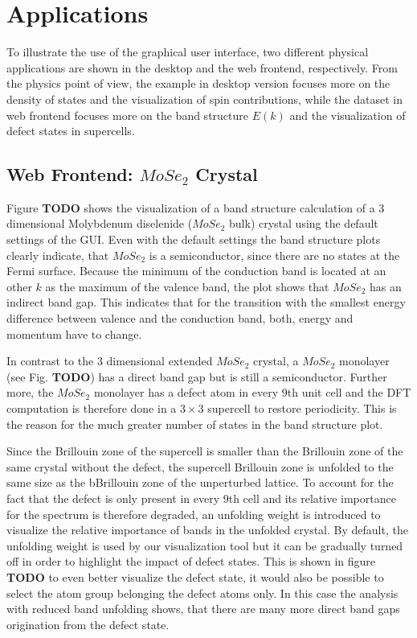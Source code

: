 \chapter{Applications}
\label{chap:applications}


To illustrate the use of the graphical user interface, two different physical
applications are shown in the desktop and the web frontend, respectively. From
the physics point of view, the example in desktop version focuses more on the
density of states and the visualization of spin contributions, while the dataset
in web frontend focuses more on the band structure $E(k)$ and the visualization
of defect states in supercells.

\section{Web Frontend: $MoSe_2$ Crystal}

Figure \textbf{TODO} shows the visualization of a band structure calculation of
a 3 dimensional Molybdenum diselenide ($MoSe_2$ bulk) crystal using the default
settings of the GUI. Even with the default settings the band structure plots
clearly indicate, that $MoSe_2$ is a semiconductor, since there are no states at
the Fermi surface. Because the minimum of the conduction band is located at an
other $k$ as the maximum of the valence band, the plot shows that $MoSe_2$ has
an indirect band gap. This indicates that for the transition with the smallest energy difference between valence and the conduction band, both, energy and momentum have to change.

In contrast to the 3 dimensional extended $MoSe_2$ crystal, a $MoSe_2$ monolayer
(see Fig. \textbf{TODO}) has a direct band gap but is still a semiconductor.
Further more, the $MoSe_2$ monolayer has a defect atom in every 9th unit cell
and the DFT computation is therefore done in a $3 \times 3$ supercell to restore
periodicity. This is the reason for the much greater number of states in the
band structure plot. 

Since the Brillouin zone of the supercell is smaller than the Brillouin zone of
the same crystal without the defect, the supercell Brillouin zone is unfolded
to the same size as the bBrillouin zone of the unperturbed lattice. To account
for the fact that the defect is only present in every 9th cell and its relative importance for the spectrum is therefore degraded, an unfolding weight is introduced to visualize the relative importance of bands in the unfolded crystal. By default, the unfolding weight is used by our visualization tool but it can be gradually turned off in order to highlight the impact of defect states.
This is shown in figure \textbf{TODO} to even better visualize the defect state,
it would also be possible to select the atom group belonging the defect atoms
only. In this case the analysis with reduced band unfolding shows, that there
are many more direct band gaps origination from the defect state.




